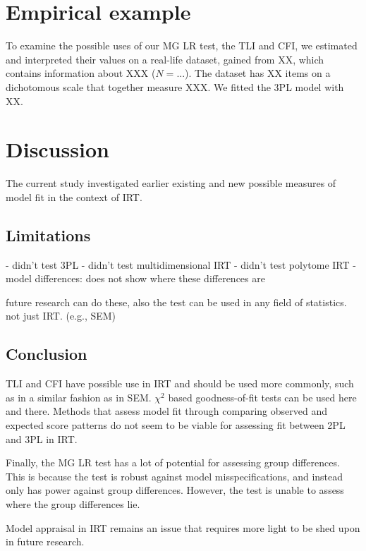 \documentclass[Royal,sageapa,times,doublespace]{sagej}
\begin{document}
\newpage

\section{Empirical example}
To examine the possible uses of our MG LR test, the TLI and CFI, we estimated and interpreted their values on a real-life dataset, gained from XX, which contains information about XXX ($N = ...$). The dataset has XX items on a dichotomous scale that together measure XXX. We fitted the 3PL model with XX.

\section{Discussion}

The current study investigated earlier existing and new possible measures of model fit in the context of IRT. 

\subsection{Limitations}

- didn't test 3PL
- didn't test multidimensional IRT
- didn't test polytome IRT
- model differences: does not show where these differences are

future research can do these, also the test can be used in any field of statistics. not just IRT. (e.g., SEM)


\subsection{Conclusion}

TLI and CFI have possible use in IRT and should be used more commonly, such as in a similar fashion as in SEM. $\chi^2$ based goodness-of-fit tests can be used here and there. Methods that assess model fit through comparing observed and expected score patterns do not seem to be viable for assessing fit between 2PL and 3PL in IRT. 

Finally, the MG LR test has a lot of potential for assessing group differences. This is because the test is robust against model misspecifications, and instead only has power against group differences. However, the test is unable to assess where the group differences lie.

Model appraisal in IRT remains an issue that requires more light to be shed upon in future research. 

\newpage

%
%
\end{document}
